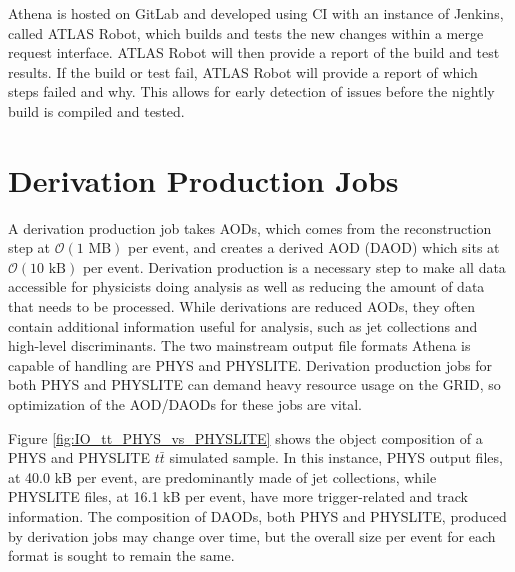 Athena is hosted on GitLab and developed using CI with an instance of Jenkins, called ATLAS Robot, which builds and tests the new changes within a merge request interface.\cite{athena-gitlab}\cite{Jenkins}
ATLAS Robot will then provide a report of the build and test results.
If the build or test fail, ATLAS Robot will provide a report of which steps failed and why.
This allows for early detection of issues before the nightly build is compiled and tested.


\section{Derivation Production Jobs}
 \label{section: ATLASIO_Derivation}

A derivation production job takes AODs, which comes from the reconstruction step at $\mathcal{O}(1 \text{ MB})$ per event, and creates a derived AOD (DAOD) which sits at $\mathcal{O}(10 \text{ kB})$ per event.
Derivation production is a necessary step to make all data accessible for physicists doing analysis as well as reducing the amount of data that needs to be processed.
While derivations are reduced AODs, they often contain additional information useful for analysis, such as jet collections and high-level discriminants.\cite{PHYSLITE_A_new_2024}
The two mainstream output file formats Athena is capable of handling are PHYS and PHYSLITE.  
Derivation production jobs for both PHYS and PHYSLITE can demand heavy resource usage on the GRID, so optimization of the AOD/DAODs for these jobs are vital. 


Figure \ref{fig:IO_tt_PHYS_vs_PHYSLITE} shows the object composition of a PHYS and PHYSLITE $t\bar{t}$ simulated sample. 
In this instance, PHYS output files, at 40.0 kB per event, are predominantly made of jet collections, while PHYSLITE files, at 16.1 kB per event, have more trigger-related and track information.
The composition of DAODs, both PHYS and PHYSLITE, produced by derivation jobs may change over time, but the overall size per event for each format is sought to remain the same. 

